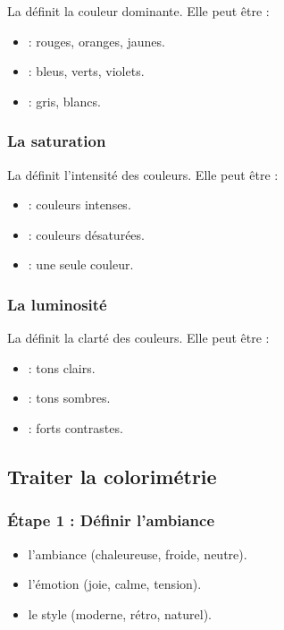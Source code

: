 La  définit la couleur dominante. Elle peut être :

\begin{itemize}
    \item {} : rouges, oranges, jaunes.
    \item {} : bleus, verts, violets.
    \item {} : gris, blancs.
\end{itemize}

\subsubsection{La saturation}

La  définit l'intensité des couleurs. Elle peut être :

\begin{itemize}
    \item {} : couleurs intenses.
    \item {} : couleurs désaturées.
    \item {} : une seule couleur.
\end{itemize}

\subsubsection{La luminosité}

La  définit la clarté des couleurs. Elle peut être :

\begin{itemize}
    \item {} : tons clairs.
    \item {} : tons sombres.
    \item {} : forts contrastes.
\end{itemize}

\subsection{Traiter la colorimétrie}

\subsubsection{Étape 1 : Définir l'ambiance}

\begin{itemize}
    \item {} l'ambiance (chaleureuse, froide, neutre).
    \item {} l'émotion (joie, calme, tension).
    \item {} le style (moderne, rétro, naturel).
\end{itemize}

